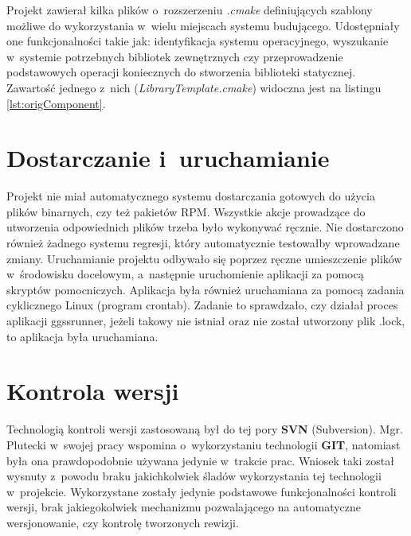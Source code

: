 Projekt zawierał kilka plików o~rozszerzeniu \textit{.cmake} definiujących szablony możliwe do wykorzystania w~wielu miejscach systemu budującego. Udostępniały one funkcjonalności takie jak: identyfikacja systemu operacyjnego, wyszukanie w~systemie potrzebnych bibliotek zewnętrznych czy przeprowadzenie podstawowych operacji koniecznych do stworzenia biblioteki statycznej. Zawartość jednego z~nich (\textit{LibraryTemplate.cmake}) widoczna jest na listingu \ref{lst:origComponent}.


\section{Dostarczanie i~uruchamianie}

Projekt nie miał automatycznego systemu dostarczania gotowych do użycia plików binarnych, czy też pakietów RPM. Wszystkie akcje prowadzące do utworzenia odpowiednich plików trzeba było wykonywać ręcznie. Nie dostarczono również żadnego systemu regresji, który automatycznie testowałby wprowadzane zmiany. Uruchamianie projektu odbywało się poprzez ręczne umieszczenie plików w~środowisku docelowym, a~następnie uruchomienie aplikacji za pomocą skryptów pomocniczych. Aplikacja była również uruchamiana za pomocą zadania cyklicznego Linux (program crontab). Zadanie to sprawdzało, czy działał proces aplikacji ggssrunner, jeżeli takowy nie istniał oraz nie został utworzony plik .lock, to aplikacja była uruchamiana.

\section{Kontrola wersji}

Technologią kontroli wersji zastosowaną był do tej pory \textbf{SVN} (Subversion). Mgr. Plutecki w~swojej pracy wspomina o~wykorzystaniu technologii \textbf{GIT}, natomiast była ona prawdopodobnie używana jedynie w~trakcie prac. Wniosek taki został wysnuty z~powodu braku jakichkolwiek śladów wykorzystania tej technologii w~projekcie. Wykorzystane zostały jedynie podstawowe funkcjonalności kontroli wersji, brak jakiegokolwiek mechanizmu pozwalającego na automatyczne wersjonowanie, czy kontrolę tworzonych rewizji.



